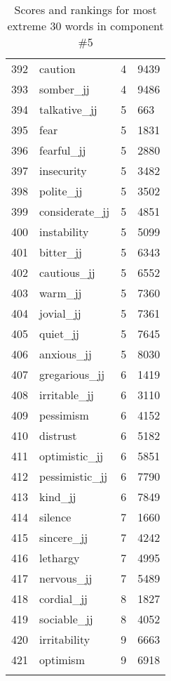 \begin{longtable}[!htbp]{| rlr@{.}l |}
    392 & caution & 4 & 9439 \\
    393 & somber\_jj & 4 & 9486 \\
    394 & talkative\_jj & 5 & 663 \\
    395 & fear & 5 & 1831 \\
    396 & fearful\_jj & 5 & 2880 \\
    397 & insecurity & 5 & 3482 \\
    398 & polite\_jj & 5 & 3502 \\
    399 & considerate\_jj & 5 & 4851 \\
    400 & instability & 5 & 5099 \\
    401 & bitter\_jj & 5 & 6343 \\
    402 & cautious\_jj & 5 & 6552 \\
    403 & warm\_jj & 5 & 7360 \\
    404 & jovial\_jj & 5 & 7361 \\
    405 & quiet\_jj & 5 & 7645 \\
    406 & anxious\_jj & 5 & 8030 \\
    407 & gregarious\_jj & 6 & 1419 \\
    408 & irritable\_jj & 6 & 3110 \\
    409 & pessimism & 6 & 4152 \\
    410 & distrust & 6 & 5182 \\
    411 & optimistic\_jj & 6 & 5851 \\
    412 & pessimistic\_jj & 6 & 7790 \\
    413 & kind\_jj & 6 & 7849 \\
    414 & silence & 7 & 1660 \\
    415 & sincere\_jj & 7 & 4242 \\
    416 & lethargy & 7 & 4995 \\
    417 & nervous\_jj & 7 & 5489 \\
    418 & cordial\_jj & 8 & 1827 \\
    419 & sociable\_jj & 8 & 4052 \\
    420 & irritability & 9 & 6663 \\
    421 & optimism & 9 & 6918 \\
    \hline
    \caption{Scores and rankings for most extreme 30 words in component \#5} \\
\end{longtable}
